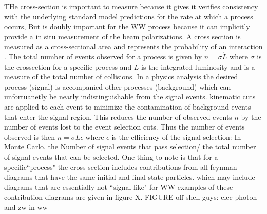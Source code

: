 THe cross-section is important to measure because it gives it verifies consistency with the underlying standard model predictions for the rate at which a process occurs, But is doubly important for the WW process because it can implicitly provide a in situ measurement of the beam polarizations. A cross section is measured as a cross-sectional area and represents the probability of an interaction . The total number of events observed for a process is given by $n = \sigma \dot L$ where $\sigma$ is the crossection for a specific process and $L$ is the integrated luminosity and is a measure of the total number of collisions. In a physics analysis the desired process (signal) is accompanied other processes (background) which can unfortuanetly be nearly indistinguishable from the signal events. kinematic cuts are applied to each event to minimize the contamination of background events that enter the signal region. This reduces the number of observed events $n$ by the number of events lost to the event selection cuts. Thus the number of events observed is then $n = \sigma \dot L \dot \epsilon$ where $\epsilon$ is the efficiency of the signal selection: In Monte Carlo, the Number of signal events that pass selection/ the total number of signal events that can be selected.  
One thing to note is that for a specific``process" the cross section includes contributions from all feynman diagrams that have the same initial and final state particles. which may include diagrams that are essentially not ``signal-like" for WW examples of these contribution diagrams are given in figure X.
FIGURE off shell guys: elec photon and zw in ww





